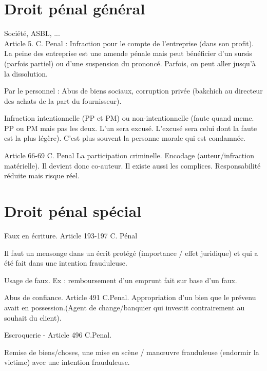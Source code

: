 \documentclass{book}
\begin{document}
\section{Droit pénal général}

Société, ASBL, ...\\

Article 5. C. Penal : Infraction pour le compte de l'entreprise (dans son profit). La peine des entreprise est une amende pénale mais peut bénéficier d'un sursis (parfois partiel) ou d'une suspension du prononcé. Parfois, on peut aller jusqu'à la dissolution.

Par le personnel : Abus de biens sociaux, corruption privée (bakchich au directeur des achats de la part du fournisseur).

Infraction intentionnelle (PP et PM) ou non-intentionnelle (faute quand meme. PP ou PM mais pas les deux. L'un sera excusé. L'excusé sera celui dont la faute est la plus légère). C'est plus souvent la personne morale qui est condamnée.

Article 66-69 C. Penal La participation criminelle. Encodage (auteur/infraction matérielle). Il devient donc co-auteur. Il existe aussi les complices. Responsabilité réduite mais risque réel. 

\section{Droit pénal spécial}

Faux en écriture. Article 193-197 C. Pénal

Il faut un mensonge dans un écrit protégé (importance / effet juridique) et qui a été fait dans une intention frauduleuse.

Usage de faux. Ex : remboursement d'un emprunt fait sur base d'un faux.

Abus de confiance. Article 491 C.Penal. Appropriation d'un bien que le prévenu avait en possession.(Agent de change/banquier qui investit contrairement au souhait du client).

Escroquerie - Article 496 C.Penal.

Remise de biens/choses, une mise en scène / manœuvre frauduleuse (endormir la victime) avec une intention frauduleuse.











\nocite{*}

\end{document}
